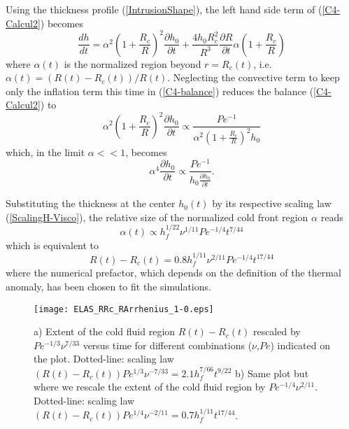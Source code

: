 Using the thickness profile (\ref{IntrusionShape}), the left hand side
term of (\ref{C4-Calcul2}) becomes
\begin{equation}
  \frac{d h}{d t} = \alpha^2\left(1+\frac{R_c}{R}\right)^2\frac{\partial h_0}{\partial
    t}+\frac{4h_0R_c^2}{R^3}\frac{\partial
    R}{\partial
    t}\alpha\left(1+\frac{R_c}{R}\right) 
  \label{C4-balance}
\end{equation}
where $\alpha  (t)$ is the  normalized region beyond  $r=R_c(t)$, i.e.
$\alpha(t)= \left(R(t)-R_c(t)\right)/R(t)$.  Neglecting the convective
term to keep  only the inflation term this  time in (\ref{C4-balance})
reduces the balance (\ref{C4-Calcul2}) to
\begin{equation}
  \alpha^2\left(1+\frac{R_c}{R}\right)^2\frac{\partial h_0}{\partial
    t}\propto \frac{Pe^{-1}}{\alpha^2\left(1+\frac{R_c}{R}\right)^2h_0}
\end{equation}
which, in the limit $\alpha<<1$, becomes
\begin{equation}
  \alpha^4\frac{\partial h_0}{\partial
    t} \propto \frac{Pe^{-1}}{h_0\frac{\partial h_0}{\partial t}}.
\end{equation}

Substituting the  thickness at the  center $h_0(t)$ by  its respective
scaling  law   (\ref{ScalingH-Visco}),  the   relative  size   of  the
normalized cold front region $\alpha$ reads
\begin{equation}
  \alpha(t) \propto h_f^{1/22}\nu^{1/11}Pe^{-1/4}t^{7/44}
\end{equation}
which is equivalent to
\begin{equation}
  R(t)-R_c(t) = 0.8h_f^{1/11}\nu^{2/11}Pe^{-1/4}t^{17/44}
  \label{C4-ScalingRRc-Heating}
\end{equation}
where the numerical prefactor, which  depends on the definition of the
thermal anomaly, has been chosen to fit the simulations.

\begin{figure}
  \begin{center}
    \graphicspath{ {/Users/thorey/Documents/These/Projet/Refroidissement/Skin_Model/Figure/Figure_Heating/} }
    \texttt{[image: ELAS\_RRc\_RArrhenius\_1-0.eps]}
    \caption{a) Extent of the cold fluid region $R(t)-R_c(t)$ rescaled
      by $Pe^{-1/3}\nu^{7/33}$ versus  time for different combinations
      ($\nu$,$Pe$) indicated  on the  plot.  Dotted-line:  scaling law
      $(R(t)-R_c(t))Pe^{1/3}\nu^{-7/33}=  2.1  h_f^{7/66}t^{9/22}$  b)
      Same plot  but where  we rescale  the extent  of the  cold fluid
      region  by  $Pe^{-1/4}\nu^{2/11}$.    Dotted-line:  scaling  law
      $(R(t)-R_c(t))Pe^{1/4}\nu^{-2/11}= 0.7 h_f^{1/11}t^{17/44}$.}
    \label{C4-ELAS_RRc_RArrhenius_1-0}
  \end{center}
\end{figure}

